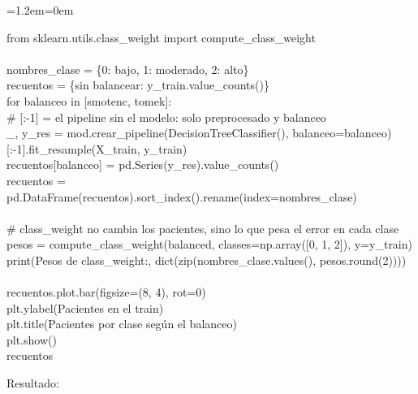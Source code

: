 \documentclass[11pt,a4paper]{article}
\newenvironment{codigo}
  {\par\smallskip\begin{list}{}{\leftmargin=1.2em\rightmargin=0em}\item\relax\ttfamily\scriptsize\raggedright}
  {\end{list}\smallskip}
\begin{document}
{\begin{codigo}
from sklearn.utils.class\_\allowbreak{}weight import compute\_\allowbreak{}class\_\allowbreak{}weight \\{}
\mbox{} \\{}
nombres\_\allowbreak{}clase = \{0: \textquotedbl{}bajo\textquotedbl{}, 1: \textquotedbl{}moderado\textquotedbl{}, 2: \textquotedbl{}alto\textquotedbl{}\} \\{}
recuentos = \{\textquotedbl{}sin balancear\textquotedbl{}: y\_\allowbreak{}train.value\_\allowbreak{}counts()\} \\{}
for balanceo in [\textquotedbl{}smotenc\textquotedbl{}, \textquotedbl{}tomek\textquotedbl{}]: \\{}
\hspace*{2.08em}\# [:-1] = el pipeline sin el modelo: solo preprocesado y balanceo \\{}
\hspace*{2.08em}\_\allowbreak{}, y\_\allowbreak{}res = mod.crear\_\allowbreak{}pipeline(DecisionTreeClassifier(), balanceo=balanceo)[:-1].fit\_\allowbreak{}resample(X\_\allowbreak{}train, y\_\allowbreak{}train) \\{}
\hspace*{2.08em}recuentos[balanceo] = pd.Series(y\_\allowbreak{}res).value\_\allowbreak{}counts() \\{}
recuentos = pd.DataFrame(recuentos).sort\_\allowbreak{}index().rename(index=nombres\_\allowbreak{}clase) \\{}
\mbox{} \\{}
\# class\_\allowbreak{}weight no cambia los pacientes, sino lo que pesa el error en cada clase \\{}
pesos = compute\_\allowbreak{}class\_\allowbreak{}weight(\textquotedbl{}balanced\textquotedbl{}, classes=np.array([0, 1, 2]), y=y\_\allowbreak{}train) \\{}
print(\textquotedbl{}Pesos de class\_\allowbreak{}weight:\textquotedbl{}, dict(zip(nombres\_\allowbreak{}clase.values(), pesos.round(2)))) \\{}
\mbox{} \\{}
recuentos.plot.bar(figsize=(8, 4), rot=0) \\{}
plt.ylabel(\textquotedbl{}Pacientes en el train\textquotedbl{}) \\{}
plt.title(\textquotedbl{}Pacientes por clase según el balanceo\textquotedbl{}) \\{}
plt.show() \\{}
recuentos
\end{codigo}
Resultado:

}
\end{document}
